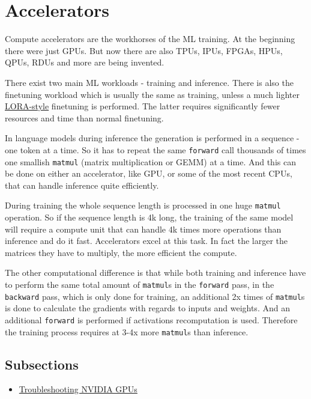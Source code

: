 \documentclass[
]{report}
\author{}
\date{2024-02-20}
\providecommand{\tightlist}{%
  \setlength{\itemsep}{0pt}\setlength{\parskip}{0pt}}\usepackage{longtable,booktabs,array}
\begin{document}
\chapter{Accelerators}\label{accelerators}

Compute accelerators are the workhorses of the ML training. At the
beginning there were just GPUs. But now there are also TPUs, IPUs,
FPGAs, HPUs, QPUs, RDUs and more are being invented.

There exist two main ML workloads - training and inference. There is
also the finetuning workload which is usually the same as training,
unless a much lighter
\href{https://arxiv.org/abs/2106.09685}{LORA-style} finetuning is
performed. The latter requires significantly fewer resources and time
than normal finetuning.

In language models during inference the generation is performed in a
sequence - one token at a time. So it has to repeat the same
\texttt{forward} call thousands of times one smallish \texttt{matmul}
(matrix multiplication or GEMM) at a time. And this can be done on
either an accelerator, like GPU, or some of the most recent CPUs, that
can handle inference quite efficiently.

During training the whole sequence length is processed in one huge
\texttt{matmul} operation. So if the sequence length is 4k long, the
training of the same model will require a compute unit that can handle
4k times more operations than inference and do it fast. Accelerators
excel at this task. In fact the larger the matrices they have to
multiply, the more efficient the compute.

The other computational difference is that while both training and
inference have to perform the same total amount of \texttt{matmul}s in
the \texttt{forward} pass, in the \texttt{backward} pass, which is only
done for training, an additional 2x times of \texttt{matmul}s is done to
calculate the gradients with regards to inputs and weights. And an
additional \texttt{forward} is performed if activations recomputation is
used. Therefore the training process requires at 3-4x more
\texttt{matmul}s than inference.

\section{Subsections}\label{subsections}

\begin{itemize}
\tightlist
\item
  \href{nvidia/debug.md}{Troubleshooting NVIDIA GPUs}
\end{itemize}
\end{document}
